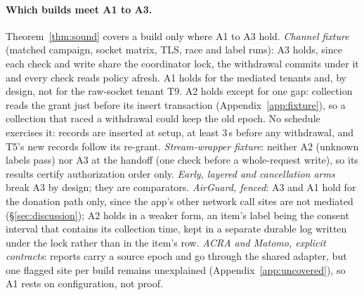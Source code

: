 \paragraph{Which builds meet A1 to A3.} Theorem~\ref{thm:sound} covers a build only where A1 to A3 hold.
\emph{Channel fixture} (matched campaign, socket matrix, TLS, race and label runs): A3 holds, since each check and write
share the coordinator lock, the withdrawal commits under it and every check reads policy afresh. A1 holds for the mediated
tenants and, by design, not for the raw-socket tenant T9. A2 holds except for one gap: collection reads the grant just
before its insert transaction (Appendix~\ref{app:fixture}), so a collection that raced a withdrawal could keep the old
epoch. No schedule exercises it: records are inserted at setup, at least 3\,s before any withdrawal, and T5's new records
follow its re-grant. \emph{Stream-wrapper fixture}: neither A2 (unknown labels pass) nor A3 at the handoff (one check
before a whole-request write), so its results certify authorization order only. \emph{Early, layered and cancellation
arms} break A3 by design; they are comparators. \emph{AirGuard, fenced}: A3 and A1 hold for the donation path only, since
the app's other network call sites are not mediated (\S\ref{sec:discussion}); A2 holds in a weaker form, an item's label
being the consent interval that contains its collection time, kept in a separate durable log written under the lock
rather than in the item's row. \emph{ACRA and Matomo, explicit contracts}: reports carry a source epoch and go through the
shared adapter, but one flagged site per build remains unexplained (Appendix~\ref{app:uncovered}), so A1 rests on
configuration, not proof.

